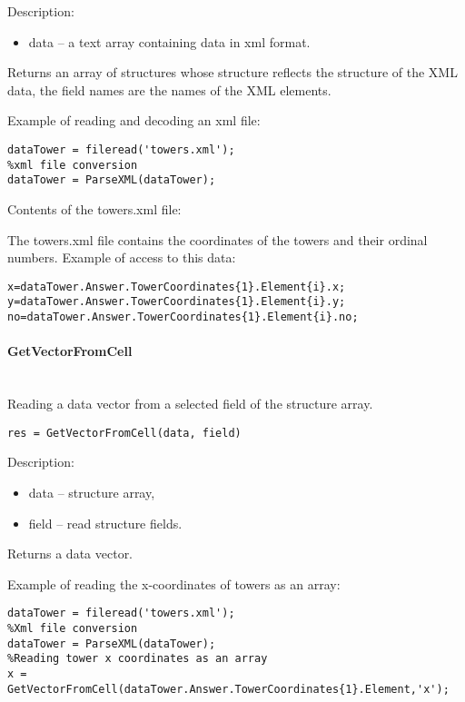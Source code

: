 Description:
\begin{itemize}
\item data -- a text array containing data in xml format.
\end{itemize}

Returns an array of structures whose structure reflects the structure of the XML data, the field names are the names of the XML elements.

Example of reading and decoding an xml file:
\begin{lstlisting}[style=Matlab-editor]
%Reading xml file
dataTower = fileread('towers.xml');
%xml file conversion
dataTower = ParseXML(dataTower);
\end{lstlisting}

Contents of the towers.xml file:


The towers.xml file contains the coordinates of the towers and their ordinal numbers. Example of access to this data:
\begin{lstlisting}[style=Matlab-editor]
x=dataTower.Answer.TowerCoordinates{1}.Element{i}.x;
y=dataTower.Answer.TowerCoordinates{1}.Element{i}.y;
no=dataTower.Answer.TowerCoordinates{1}.Element{i}.no;
\end{lstlisting}

\paragraph{GetVectorFromCell} \hspace{0pt} \\
Reading a data vector from a selected field of the structure array.
\begin{lstlisting}[style=Matlab-editor]
res = GetVectorFromCell(data, field)
\end{lstlisting}

Description:
\begin{itemize}
\item data -- structure array,
\item field -- read structure fields.
\end{itemize}

Returns a data vector.

Example of reading the x-coordinates of towers as an array:
\begin{lstlisting}[style=Matlab-editor]
%Reading xml file
dataTower = fileread('towers.xml');
%Xml file conversion
dataTower = ParseXML(dataTower);
%Reading tower x coordinates as an array
x = GetVectorFromCell(dataTower.Answer.TowerCoordinates{1}.Element,'x');
\end{lstlisting}

